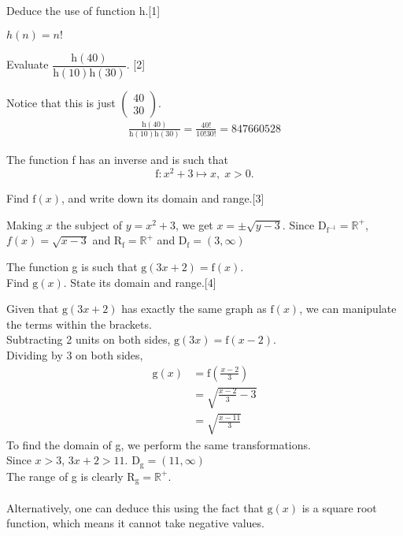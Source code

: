 \documentclass[12pt, a4 paper]{article}
\begin{document}
\begin{outline}[enumerate]
			\2 Deduce the use of function h.\hfill[1]
			\begin{answer}
				$h(n)=n!$
			\end{answer}
			        
			\2 Evaluate $\dfrac{\textrm{h}(40)}{\textrm{h}(10)\textrm{h}(30)}$. \hfill[2]
			\begin{answer}
				Notice that this is just $\left(\begin{smallmatrix}40\\30\end{smallmatrix}\right)$.
				\begin{align*}
					\frac{\textrm{h}(40)}{\textrm{h}(10)\textrm{h}(30)} = \frac{40!}{10!30!} = 847660528 
				\end{align*}
			\end{answer}
			        
			\1 The function f has an inverse and is such that \[\textrm{f}:x^2+3 \mapsto x,\;x>0.\]
				
			\2 Find $\textrm{f}(x)$, and write down its domain and range.\hfill[3]
			\begin{answer}
				Making $x$ the subject of $y=x^2+3$, we get $x=\pm\sqrt{y-3}$. Since D$_{\textrm{f}^{-1}} = \mathbb{R}^+$, $f(x) = \sqrt{x-3}$ and R$_\textrm{f}=\mathbb{R}^+$ and D$_\textrm{f}=(3,\infty)$
			\end{answer}
				    
			\2 The function g is such that $\textrm{g}(3x+2)=\textrm{f}(x)$.\\ Find $\textrm{g}(x)$. State its domain and range.\hfill[4]
			\begin{answer}
				Given that $\textrm{g}(3x+2)$ has exactly the same graph as $\textrm{f}(x)$, we can manipulate the terms within the brackets.\\
				Subtracting 2 units on  both sides, $\textrm{g}(3x)=\textrm{f}(x-2)$.\\
				Dividing by 3 on both sides,
				\begin{align*}
					\textrm{g}(x) & =\textrm{f}\left(\frac{x-2}{3}\right) \\
					              & = \sqrt{\frac{x-2}{3}-3}              \\
					              & = \sqrt{\frac{x-11}{3}}               
				\end{align*}
				To find the domain of g, we perform the same transformations.\\
				Since $x>3$, $3x+2>11$. D$_{\textrm{g}}=(11,\infty)$\\
				The range of g is clearly R$_\textrm{g}=\mathbb{R}^+$.\\\\
				Alternatively, one can deduce this using the fact that $\textrm{g}(x)$ is a square root function, which means it cannot take negative values.
			\end{answer}
			    
			\end{outline}
			
\end{document}
